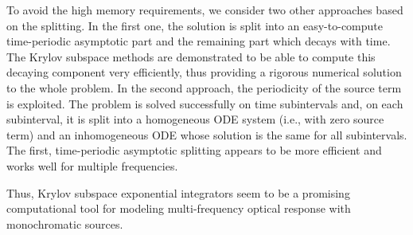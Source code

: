 \documentclass[11pt]{elsarticle}
\begin{document}
To avoid the high memory requirements, we consider two other
approaches based on the splitting.  In the first one, the solution
is split into an easy-to-compute time-periodic asymptotic part and 
the remaining part which decays with time.  The Krylov subspace methods
are demonstrated to be able to compute this decaying component very
efficiently, thus providing a rigorous numerical solution
to the whole problem.  In the second approach, the periodicity
of the source term is exploited.  The problem is solved
successfully on time subintervals and, on each subinterval,
it is split into a homogeneous ODE system (i.e., with zero source term)
and an inhomogeneous ODE whose solution is the same for all
subintervals.  The first, time-periodic asymptotic splitting
appears to be more efficient and works well for multiple
frequencies.

Thus, Krylov subspace exponential integrators seem
to be a promising computational tool for modeling 
multi-frequency optical response with monochromatic sources.

%


\end{document}
